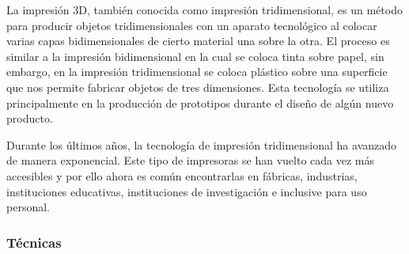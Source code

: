 	\par \noindent
		La impresión 3D, también conocida como impresión tridimensional, es un método para
		producir objetos tridimensionales con un aparato tecnológico al colocar varias capas
		bidimensionales de cierto material una sobre la otra. El proceso es similar a la impresión
		bidimensional en la cual se coloca tinta sobre papel, sin embargo, en la impresión
		tridimensional se coloca plástico sobre una superficie que nos permite fabricar objetos de tres
		dimensiones. Esta tecnología se utiliza principalmente en la producción de prototipos durante
		el diseño de algún nuevo producto.

	\par \noindent
		Durante los últimos años, la tecnología de impresión tridimensional ha avanzado de
		manera exponencial. Este tipo de impresoras se han vuelto cada vez más accesibles y por ello
		ahora es común encontrarlas en fábricas, industrias, instituciones educativas, instituciones de
		investigación e inclusive para uso personal.

	\subsubsection{Técnicas}
	
